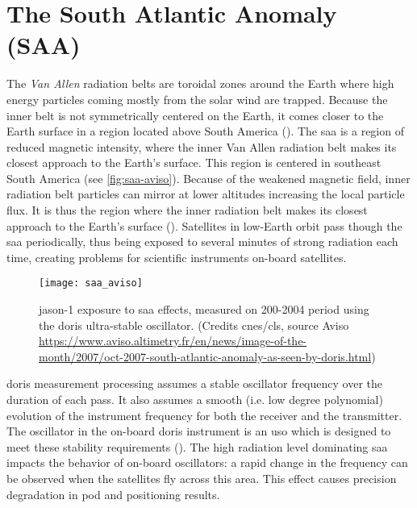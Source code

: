 \section{The South Atlantic Anomaly (SAA)}\label{sec:saa}

\iffalse
https://www.aviso.altimetry.fr/en/news/image-of-the-month/2007/oct-2007-south-atlantic-anomaly-as-seen-by-doris.html
https://ids-doris.org/images/documents/report/ids_workshop_2010/IDS10_s1_Stepanek_Spot5SAA.pdf
\fi

The \emph{Van Allen} radiation belts 
are toroidal zones around the Earth where high energy particles coming mostly 
from the solar wind are trapped. Because the inner belt is not symmetrically 
centered on the Earth, it comes closer to the Earth surface in a region 
located above South America (\cite{Jalabert2018}).
The \gls{saa} is a region of reduced magnetic intensity, where 
the inner Van Allen radiation belt makes its closest approach 
to the Earth's surface. This region is centered in southeast South America (see 
\autoref{fig:saa-aviso}). Because 
of the weakened magnetic 
field, inner radiation belt particles can mirror at lower altitudes increasing 
the local particle flux. It is thus the region where the inner radiation belt 
makes its closest approach to the Earth's surface (\cite{Anderson2018}). 
Satellites in low-Earth orbit pass though the \gls{saa} periodically, thus being 
exposed to several minutes of strong radiation each time, creating problems for 
scientific instruments on-board satellites.

\begin{figure}[ht]
  \centering
  \texttt{[image: saa\_aviso]}
  \caption{\gls{jason}-1 exposure to \gls{saa} effects, measured on 200-2004 
    period using the \gls{doris} ultra-stable oscillator. (Credits \gls{cnes}/\gls{cls}, 
    source Aviso \url{https://www.aviso.altimetry.fr/en/news/image-of-the-month/2007/oct-2007-south-atlantic-anomaly-as-seen-by-doris.html})}
  \label{fig:saa-aviso}
\end{figure}

\gls{doris} measurement processing assumes a stable oscillator frequency over 
the duration of each pass. It also assumes a smooth (i.e. low degree polynomial) 
evolution of the instrument frequency for both the receiver and the transmitter. 
The oscillator in the on-board \gls{doris} instrument is an \gls{uso} which is 
designed to meet these stability requirements (\cite{Jalabert2018}).
The high radiation level dominating \gls{saa} impacts the behavior of on-board 
oscillators: a rapid change in the frequency can be observed when the satellites 
fly across this area. This effect causes precision degradation in \gls{pod} and 
positioning results.

